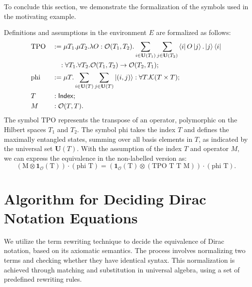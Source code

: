 \documentclass[runningheads]{llncs}
\begin{document}
To conclude this section, we demonstrate the formalization of the symbols used in the motivating example.
\begin{example}
    \label{ex: formalizing motivating}
    Definitions and assumptions in the environment \( E \) are formalized as follows:
    \begin{align*}
        & \text{TPO} && := \mu T_1. \mu T_2. \lambda O : \mathcal{O}(T_1, T_2). \sum_{i \in \mathbf{U}(T_1)} \sum_{j \in \mathbf{U}(T_2)} \bra{i} O \ket{j} . \ket{j}\bra{i} \\
        & &&\quad : \forall T_1. \forall T_2. \mathcal{O}(T_1, T_2) \to \mathcal{O}(T_2, T_1); \\
        &\text{phi} &&:= \mu T. \sum_{i \in \mathbf{U}(T)} \sum_{j \in \mathbf{U}(T)} \ket{(i, j)} : \forall T.\mathcal{K}(T \times T); \\
        & T && : \mathsf{Index}; \\
        & M && : \mathcal{O}(T, T).
    \end{align*}
    The symbol \( \text{TPO} \) represents the transpose of an operator, polymorphic on the Hilbert spaces \( T_1 \) and \( T_2 \). The symbol \( \text{phi} \) takes the index \( T \) and defines the maximally entangled states, summing over all basis elements in \( T \), as indicated by the universal set \( \mathbf{U}(T) \).
    With the assumption of the index \( T \) and operator \( M \), we can express the equivalence in the non-labelled version as:
    \[
    (\textrm{M} \otimes \mathbf{1}_\mathcal{O}(\textrm{T})) \cdot (\textrm{phi T}) = (\mathbf{1}_\mathcal{O}(\textrm{T}) \otimes (\textrm{TPO T T M})) \cdot (\textrm{phi T}).
    \]
\end{example}




\section{Algorithm for Deciding Dirac Notation Equations}
\label{sec: decide}

We utilize the term rewriting technique to decide the equivalence of Dirac notation, based on its axiomatic semantics. The process involves normalizing two terms and checking whether they have identical syntax. This normalization is achieved through matching and substitution in universal algebra, using a set of predefined rewriting rules.
\end{document}
